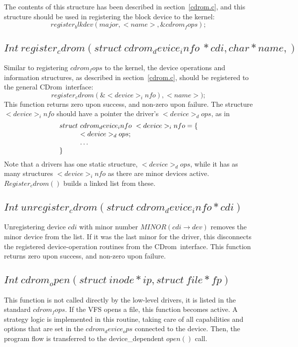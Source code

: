 \documentclass{article}
\def\cdrom{{\sc CDrom}}
\begin{document}
The contents of this structure has been described in
section~\ref{cdrom.c}, and this structure should be used in
registering the block device to the kernel:
$$
register_blkdev(major, <name>, \&cdrom_fops);
$$

\subsection{$Int\ register_cdrom( struct\ cdrom_device_info\ * cdi, 
  char * name,)$}

Similar to registering $cdrom_fops$ to the kernel, the device
operations and information structures, as described in
section~\ref{cdrom.c}, should be registered to the general \cdrom\ 
interface:
$$
register_cdrom(\&<device>_info), <name>);
$$
This function returns zero upon success, and non-zero upon
failure. The structure $<device>_info$ should have a pointer the
driver's $<device>_dops$, as in 
$$
\vbox{\halign{&$#$\hfil\cr
struct\ &cdrom_device_info\ <device>_info = \{\cr
& <device>_dops;\cr
&\ldots\cr
\}\cr
}}$$
Note that a drivers has one static structure, $<device>_dops$, while
it has as many structures $<device>_info$ as there are minor devices
active. $Register_cdrom()$ builds a linked list from these. 

\subsection{$Int\ unregister_cdrom(struct\ cdrom_device_info * cdi)$}

Unregistering device $cdi$ with minor number $MINOR(cdi\to dev)$
removes the minor device from the list. If it was the last minor for
the driver, this disconnects the registered device-operation routines
from the \cdrom\ interface. This function returns zero upon success,
and non-zero upon failure.

\subsection{$Int\ cdrom_open(struct\ inode * ip, struct\ file * fp)$}

This function is not called directly by the low-level drivers, it is
listed in the standard $cdrom_fops$. If the VFS opens a file, this
function becomes active. A strategy logic is implemented in this
routine, taking care of all capabilities and options that are set in
the $cdrom_device_ops$ connected to the device. Then, the program flow is
transferred to the device_dependent $open()$ call. 
\end{document}
